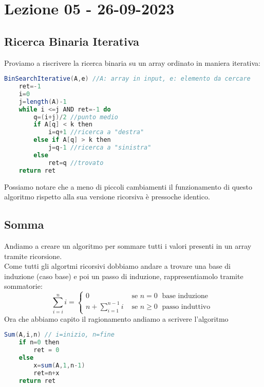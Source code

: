 \section{Lezione 05 - 26-09-2023}

\subsection{Ricerca Binaria Iterativa}
Proviamo a riscrivere la ricerca binaria su un array ordinato in maniera iterativa:
\begin{lstlisting}[language=Java]
BinSearchIterative(A,e) //A: array in input, e: elemento da cercare
	ret=-1
	i=0
	j=length(A)-1
	while i <=j AND ret=-1 do
		q=(i+j)/2 //punto medio
		if A[q] < k then
			i=q+1 //ricerca a "destra"
		else if A[q] > k then
			j=q-1 //ricerca a "sinistra"
		else 
			ret=q //trovato
	return ret
\end{lstlisting}
Possiamo notare che a meno di piccoli cambiamenti il funzionamento di questo algoritmo rispetto alla sua versione ricorsiva è pressoche identico.

\subsection{Somma}
Andiamo a creare un algoritmo per sommare tutti i valori presenti in un array tramite ricorsione.\\
Come tutti gli algortmi ricorsivi dobbiamo andare a trovare una base di induzione (caso base) e poi un passo di induzione, rappresentiamolo tramite sommatorie:
\begin{equation*}
 \sum_{i=i}^n i =
  \begin{cases}
  0 & \text{ se } n = 0 \; \text{ base induzione } \\
  n+\sum_{i=1}^{n-1}i & \text{ se } n \ge 0 \; \text{ passo induttivo }
  \end{cases}
\end{equation*}
Ora che abbiamo capito il ragionamento andiamo a scrivere l'algoritmo
\begin{lstlisting}[language=Java]
Sum(A,i,n) // i=inizio, n=fine
	if n=0 then
		ret = 0
	else
		x=sum(A,1,n-1)
		ret=n+x
	return ret
\end{lstlisting}

\newpage

